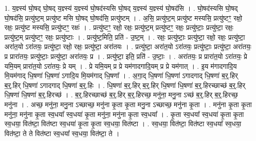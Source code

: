\documentclass[17pt]{extarticle}
\begin{document}
1. य॒ज्ञ्स्य॑ घो॒षद् घो॒षद् य॒ज्ञ्स्य॑ य॒ज्ञ्स्य॑ घो॒षद॑स्यसि घो॒षद् य॒ज्ञ्स्य॑ य॒ज्ञ्स्य॑ घो॒षद॑सि । . घो॒षद॑स्यसि घो॒षद् घो॒षद॑सि॒ प्रत्यु॑ष्ट॒म् प्रत्यु॑ष्ट मसि घो॒षद् घो॒षद॑सि॒ प्रत्यु॑ष्टम् । . अ॒सि॒ प्रत्यु॑ष्ट॒म् प्रत्यु॑ष्ट मस्यसि॒ प्रत्यु॑ष्टꣳ॒॒ रक्षो॒ रक्षः॒ प्रत्यु॑ष्ट मस्यसि॒ प्रत्यु॑ष्टꣳ॒॒ रक्षः॑ । . प्रत्यु॑ष्टꣳ॒॒ रक्षो॒ रक्षः॒ प्रत्यु॑ष्ट॒म् प्रत्यु॑ष्टꣳ॒॒ रक्षः॒ प्रत्यु॑ष्टाः॒ प्रत्यु॑ष्टा॒ रक्षः॒ प्रत्यु॑ष्ट॒म् प्रत्यु॑ष्टꣳ॒॒ रक्षः॒ प्रत्यु॑ष्टाः । . प्रत्यु॑ष्ट॒मिति॒ प्रति॑ - उ॒ष्ट॒म् । . रक्षः॒ प्रत्यु॑ष्टाः॒ प्रत्यु॑ष्टा॒ रक्षो॒ रक्षः॒ प्रत्यु॑ष्टा॒ अरा॑त॒यो ऽरा॑तयः॒ प्रत्यु॑ष्टा॒ रक्षो॒ रक्षः॒ प्रत्यु॑ष्टा॒ अरा॑तयः । . प्रत्यु॑ष्टा॒ अरा॑त॒यो ऽरा॑तयः॒ प्रत्यु॑ष्टाः॒ प्रत्यु॑ष्टा॒ अरा॑तयः॒ प्र प्रारा॑तयः॒ प्रत्यु॑ष्टाः॒ प्रत्यु॑ष्टा॒ अरा॑तयः॒ प्र । . प्रत्यु॑ष्टा॒ इति॒ प्रति॑ - उ॒ष्टाः॒ । . अरा॑तयः॒ प्र प्रारा॑त॒यो ऽरा॑तयः॒ प्रे यमि॒यम् प्रारा॑त॒यो ऽरा॑तयः॒ प्रे यम् । . प्रे यमि॒यम् प्र प्रे यम॑गादगादि॒यम् प्र प्रे यम॑गात् । . इ॒य म॑गादगादि॒य मि॒यम॑गाद् धि॒षणा॑ धि॒षणा॑ ऽगादि॒य मि॒यम॑गाद् धि॒षणा᳚ । . अ॒गा॒द् धि॒षणा॑ धि॒षणा॑ ऽगादगाद् धि॒षणा॑ ब॒र्॒.हिर् ब॒र्॒.हिर् धि॒षणा॑ ऽगादगाद् धि॒षणा॑ ब॒र्॒.हिः । . धि॒षणा॑ ब॒र्॒.हिर् ब॒र्॒.हिर् धि॒षणा॑ धि॒षणा॑ ब॒र्॒.हिरच्छाच्छ॑ ब॒र्॒.हिर् धि॒षणा॑ धि॒षणा॑ ब॒र्॒.हिरच्छ॑ । . ब॒र्॒.हिरच्छाच्छ॑ ब॒र्॒.हिर् ब॒र्॒.हिरच्छ॒ मनु॑ना॒ मनु॒ना ऽच्छ॑ ब॒र्॒.हिर् ब॒र्॒.हिरच्छ॒ मनु॑ना । . अच्छ॒ मनु॑ना॒ मनु॒ना ऽच्छाच्छ॒ मनु॑ना कृ॒ता कृ॒ता मनु॒ना ऽच्छाच्छ॒ मनु॑ना कृ॒ता । . मनु॑ना कृ॒ता कृ॒ता मनु॑ना॒ मनु॑ना कृ॒ता स्व॒धया᳚ स्व॒धया॑ कृ॒ता मनु॑ना॒ मनु॑ना कृ॒ता स्व॒धया᳚ । . कृ॒ता स्व॒धया᳚ स्व॒धया॑ कृ॒ता कृ॒ता स्व॒धया॒ वित॑ष्टा॒ वित॑ष्टा स्व॒धया॑ कृ॒ता कृ॒ता स्व॒धया॒ वित॑ष्टा । . स्व॒धया॒ वित॑ष्टा॒ वित॑ष्टा स्व॒धया᳚ स्व॒धया॒ वित॑ष्टा॒ ते ते वित॑ष्टा स्व॒धया᳚ स्व॒धया॒ वित॑ष्टा॒ ते । \newline
\end{document}
